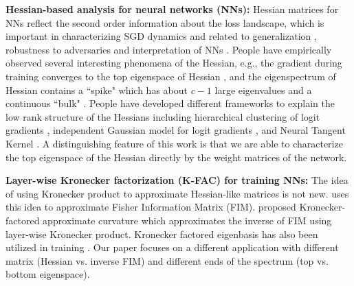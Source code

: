 \textbf{Hessian-based analysis for neural networks (NNs):} Hessian matrices for NNs reflect the second order information about the loss landscape, which is important in characterizing SGD dynamics \citep{jastrzebski2018relation} and related to generalization \citep{li2020hessian}, robustness to adversaries \citep{yao2018hessian} and interpretation of NNs \citep{singla2019understanding}. People have empirically observed several interesting phenomena of the Hessian, e.g., the gradient during training converges to the top eigenspace of Hessian \citep{gur2018gradient, ghorbani2019investigation}, and the eigenspectrum of Hessian contains a ``spike" which has about $c-1$ large eigenvalues and a continuous ``bulk" \citep{sagun2016eigenvalues, sagun2017empirical, papyan2018full}. 
People have developed different frameworks to explain the low rank structure of the Hessians including hierarchical clustering of logit gradients \citep{papyan2019measurements, papyan2020traces}, independent Gaussian model for logit gradients \citep{fort2019emergent}, and Neural Tangent Kernel \citep{jacot2019asymptotic}.
A distinguishing feature of this work is that we are able to characterize the top eigenspace of the Hessian directly by the weight matrices of the network.

\textbf{Layer-wise Kronecker factorization (K-FAC) for training NNs:} 
The idea of using Kronecker product to approximate Hessian-like matrices is not new. \citet{heskes2000natural} uses this idea to approximate Fisher Information Matrix (FIM).
\citet{martens2015optimizing} proposed Kronecker-factored approximate curvature which approximates the inverse of FIM using layer-wise Kronecker product. Kronecker factored eigenbasis has also been utilized in training \citep{george2018fast}.
Our paper focuses on a different application with different matrix (Hessian vs. inverse FIM) and different ends of the spectrum (top vs. bottom eigenspace).

